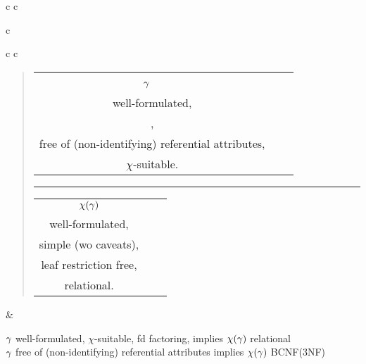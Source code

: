 {\begin{tabular} { c  c}
\begin{tabular} { c }
\begin{tabular} { c  c }
\begin{minipage}{4.5cm}
\begin{synopsis}{5cm}
\begin{quote}
																														      \begin{tabular}{ c c c}
																												          $\gamma$\ \  & &
																																	\begin{minipage}{3cm}
																																		\textbullet fd factoring,\\
																																	  \textbullet well-formulated, \\
																								                  \textbullet \newt{leaf-restriction free},\\
																																	  \textbullet free of (non-identifying)
																																		             referential attributes, \\
																																		\textbullet $\chi$-suitable. 
																																	 \end{minipage}
																																	\end{tabular} 
																																	\rule{3cm}{2pt}
																													        \begin{tabular} {c c c}
																																	$\chi(\gamma)$ & &
																																	\begin{minipage}{3cm}
																																	  \textbullet fd factoring,\\
																																		\textbullet well-formulated,\\
																																		\textbullet simple (wo caveats),\\
																																	  \textbullet leaf restriction free,\\                                                                    \textbullet relational.
																																	\end{minipage}
																																	\end{tabular}
																													   \end{quote}
																												   \end{synopsis}
																     \end{minipage}
				\end{tabular}
			\end{tabular}
			   &  \ \ \begin{minipage}{3cm}  \begin{synopsis}{2.5cm} 
				     \textbullet $\gamma$ well-formulated, $\chi$-suitable, fd factoring,  implies $\chi(\gamma)$ relational \\
						 \textbullet $\gamma$  free of (non-identifying) referential attributes implies $\chi(\gamma)$ BCNF(3NF) 
					 \end{synopsis} \end{minipage}\\
			\hline 
	\end{tabular}
	}
	
